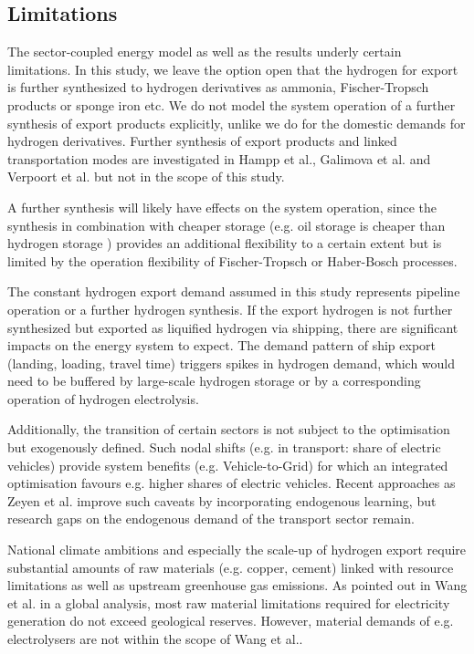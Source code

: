 \subsection*{Limitations}
\label{subsec:limitations}

The sector-coupled energy model as well as the results underly certain limitations. In this study, we leave the option open that the hydrogen for export is further synthesized to hydrogen derivatives as ammonia, Fischer-Tropsch products or sponge iron etc. We do not model the system operation of a further synthesis of export products explicitly, unlike we do for the domestic demands for hydrogen derivatives. Further synthesis of export products and linked transportation modes are investigated in Hampp et al.\cite{Hampp2023}, Galimova et al.\cite{Galimova2023} and Verpoort et al.\cite{Verpoort2023} but not in the scope of this study.

A further synthesis will likely have effects on the system operation, since the synthesis in combination with cheaper storage (e.g. oil storage is cheaper than hydrogen storage \cite{DEA2019TechnologyData}) provides an additional flexibility to a certain extent but is limited by the operation flexibility of Fischer-Tropsch or Haber-Bosch processes.

The constant hydrogen export demand assumed in this study represents pipeline operation or a further hydrogen synthesis.
If the export hydrogen is not further synthesized but exported as liquified hydrogen via shipping, there are significant impacts on the energy system to expect. The demand pattern of ship export (landing, loading, travel time) triggers spikes in hydrogen demand, which would need to be buffered by large-scale hydrogen storage or by a corresponding operation of hydrogen electrolysis. 


Additionally, the transition of certain sectors is not subject to the optimisation but exogenously defined. Such nodal shifts (e.g. in transport: share of electric vehicles) provide system benefits (e.g. Vehicle-to-Grid) for which an integrated optimisation favours e.g. higher shares of electric vehicles.
Recent approaches as Zeyen et al.\cite{Zeyen2023} improve such caveats by incorporating endogenous learning, but research gaps on the endogenous demand of the transport sector remain.

National climate ambitions and especially the scale-up of hydrogen export require substantial amounts of raw materials (e.g. copper, cement) linked with resource limitations as well as upstream greenhouse gas emissions. As pointed out in Wang et al.\cite{Wang2023} in a global analysis, most raw material limitations required for electricity generation do not exceed geological reserves. However, material demands of e.g. electrolysers are not within the scope of Wang et al.\cite{Wang2023}.

